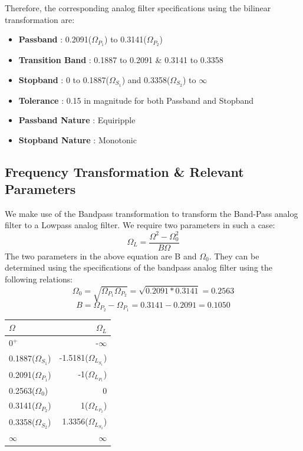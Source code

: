 \documentclass[12pt]{article}
\begin{document}
Therefore, the corresponding analog filter specifications using the bilinear transformation are:
\begin{itemize}
\item \textbf{Passband} : 0.2091($\Omega _{P_{1}}$) to 0.3141($\Omega _{P_{2}}$)
\item \textbf{Transition Band} : 0.1887 to 0.2091 \& 0.3141 to 0.3358
\item \textbf{Stopband} : 0 to 0.1887($\Omega _{S_{1}}$) and 0.3358($\Omega _{S_{2}}$) to $\infty$
\item \textbf{Tolerance} : 0.15 in magnitude for both Passband and Stopband
\item \textbf{Passband Nature} : Equiripple
\item \textbf{Stopband Nature} : Monotonic
\end{itemize}
\subsection{Frequency Transformation \& Relevant Parameters}
We make use of the Bandpass transformation to transform the Band-Pass analog filter to a Lowpass analog filter. We require two parameters in such a case:\\
\begin{equation*}
\Omega _{L} = \frac{\Omega ^{2} - \Omega _{0}^{2}}{B\Omega}
\end{equation*}
The two parameters in the above equation are B and $\Omega _{0}$. They can be determined using the specifications of the bandpass analog filter using the following relations:\\
\begin{equation*}
\Omega _{0} = \sqrt{\Omega _{P_{1}}\Omega _{P_{2}}} = \sqrt{0.2091 * 0.3141} = 0.2563
\end{equation*}
\begin{equation*}
B = \Omega _{P_{2}} - \Omega _{P_{1}} = 0.3141 - 0.2091 = 0.1050
\end{equation*}
\begin{table}[h!]
\centering
\begin{tabular}{|l|r|}\hline

$\Omega$ & $\Omega_{L}$ \\\hline
$0^{+}$ & -$\infty$ \\
0.1887($\Omega _{S_{1}}$)& -1.5181($\Omega _{L_{S_{1}}}$) \\
0.2091($\Omega _{P_{1}}$)& -1($\Omega _{L_{P_{1}}}$) \\
0.2563($\Omega _{0}$) & 0\\
0.3141($\Omega _{P_{2}}$) & 1($\Omega _{L_{P_{2}}}$) \\
0.3358($\Omega _{S_{2}}$)& 1.3356($\Omega _{L_{S_{2}}}$) \\
$\infty$ & $\infty$\\ \hline
\end{tabular}
\end{table}
\end{document}
